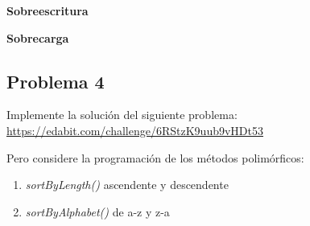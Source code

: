 \documentclass[11pt, twocolumn]{article}
\begin{document}
  \textbf{Sobreescritura}

  

  \textbf{Sobrecarga}

  

  \subsection*{Problema 4}
  Implemente la solución del siguiente problema: \url{https://edabit.com/challenge/6RStzK9uub9vHDt53}

  Pero considere la programación de los métodos polimórficos:

  \begin{enumerate}[label=\alph*.]
    \item \textit{sortByLength()} ascendente y descendente
    \item \textit{sortByAlphabet()} de a-z y z-a
  \end{enumerate}
\end{document}
